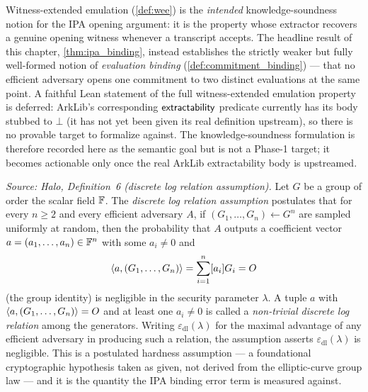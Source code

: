 Witness-extended emulation (\cref{def:wee}) is the \emph{intended}
knowledge-soundness notion for the IPA opening argument: it is the property whose
extractor recovers a genuine opening witness whenever a transcript accepts. The
headline result of this chapter, \cref{thm:ipa_binding}, instead establishes the
strictly weaker but fully well-formed notion of \emph{evaluation binding}
(\cref{def:commitment_binding}) --- that no efficient adversary opens one
commitment to two distinct evaluations at the same point. A faithful Lean
statement of the full witness-extended emulation property is deferred: ArkLib's
corresponding \(\mathsf{extractability}\) predicate currently has its body stubbed to
\(\bot\) (it has not yet been given its real definition upstream), so there is no
provable target to formalize against. The knowledge-soundness formulation is
therefore recorded here as the semantic goal but is not a Phase-1 target; it
becomes actionable only once the real ArkLib extractability body is upstreamed.

\begin{definition}
  \label{def:dl_relation_assumption}
  \textit{Source: Halo, Definition~6 (discrete log relation assumption).}
  Let \(G\) be a group of order the scalar field \(\mathbb{F}\). The \emph{discrete log
  relation assumption} postulates that for every \(n \ge 2\) and every efficient
  adversary \(A\), if \((G_{1}, \dots, G_{n}) \leftarrow G^{n}\) are sampled
  uniformly at random, then the probability that \(A\) outputs a coefficient vector
  \(a = (a_{1}, \dots, a_{n}) \in \mathbb{F}^{n}\) with some \(a_{i} \neq 0\) and
  \[
    \langle a, (G_{1}, \dots, G_{n}) \rangle = \sum_{i=1}^{n} [a_{i}]G_{i} = O
  \]
  (the group identity) is negligible in the security parameter \(\lambda\). A tuple
  \(a\) with \(\langle a, (G_{1}, \dots, G_{n}) \rangle = O\) and at least one \(a_{i} \neq
  0\) is called a \emph{non-trivial discrete log relation} among the generators.
  Writing \(\varepsilon_{\mathrm{dl}}(\lambda)\) for the maximal advantage of any
  efficient adversary in producing such a relation, the assumption asserts
  \(\varepsilon_{\mathrm{dl}}(\lambda)\) is negligible. This is a postulated
  hardness assumption --- a foundational cryptographic hypothesis taken as given,
  not derived from the elliptic-curve group law --- and it is the quantity the IPA
  binding error term is measured against.
\end{definition}

